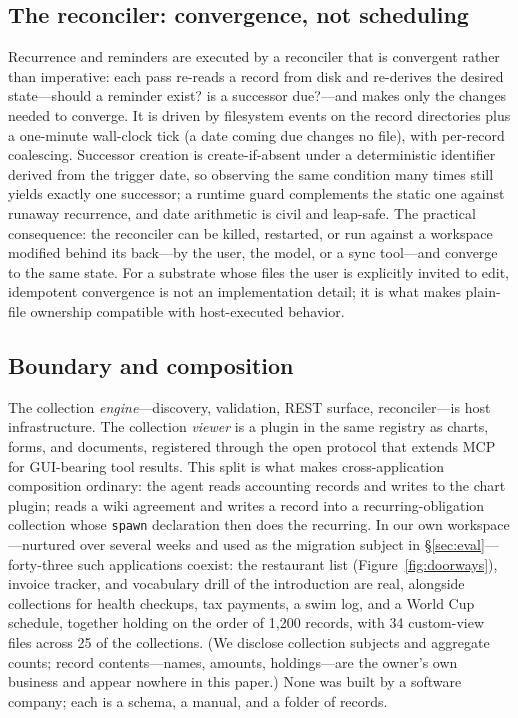 \documentclass[11pt]{article}
\newcommand{\code}[1]{\texttt{\small #1}}
\begin{document}
\subsection{The reconciler: convergence, not scheduling}
\label{sec:reconciler}

Recurrence and reminders are executed by a reconciler that is convergent rather
than imperative: each pass re-reads a record from disk and re-derives the desired
state---should a reminder exist? is a successor due?---and makes only the changes
needed to converge. It is driven by filesystem events on the record directories
plus a one-minute wall-clock tick (a date coming due changes no file), with
per-record coalescing. Successor creation is create-if-absent under a
deterministic identifier derived from the trigger date, so observing the same
condition many times still yields exactly one successor; a runtime guard
complements the static one against runaway recurrence, and date arithmetic is
civil and leap-safe. The practical consequence: the reconciler can be killed,
restarted, or run against a workspace modified behind its back---by the user, the
model, or a sync tool---and converge to the same state. For a substrate whose
files the user is explicitly invited to edit, idempotent convergence is not an
implementation detail; it is what makes plain-file ownership compatible with
host-executed behavior.

\subsection{Boundary and composition}
\label{sec:composition}

The collection \emph{engine}---discovery, validation, REST surface,
reconciler---is host infrastructure. The collection \emph{viewer} is a plugin in
the same registry as charts, forms, and documents, registered through the open
protocol that extends MCP for GUI-bearing tool results. This split is what makes
cross-application composition ordinary: the agent reads accounting records and
writes to the chart plugin; reads a wiki agreement and writes a record into a
recurring-obligation collection whose \code{spawn} declaration then does the
recurring. In our own workspace---nurtured over several weeks and used as the
migration subject in \S\ref{sec:eval}---forty-three such applications coexist:
the restaurant list (Figure~\ref{fig:doorways}), invoice tracker, and vocabulary
drill of the introduction are real, alongside collections for health checkups,
tax payments, a swim log, and a World Cup schedule, together holding on the order
of 1,200 records, with 34 custom-view files across 25 of the collections. (We
disclose collection subjects and aggregate counts; record contents---names,
amounts, holdings---are the owner's own business and appear nowhere in this
paper.) None was built by a software company; each is a schema, a manual, and a
folder of records.
\end{document}
